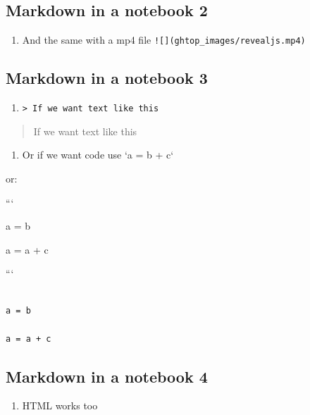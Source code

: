 \documentclass[
  letterpaper,
  DIV=11,
  numbers=noendperiod]{scrartcl}
\providecommand{\tightlist}{%
  \setlength{\itemsep}{0pt}\setlength{\parskip}{0pt}}\usepackage{longtable,booktabs,array}
\begin{document}
\hypertarget{markdown-in-a-notebook-2}{%
\subsection{Markdown in a notebook 2}\label{markdown-in-a-notebook-2}}

\begin{enumerate}
\def\labelenumi{\arabic{enumi}.}
\setcounter{enumi}{2}
\tightlist
\item
  And the same with a mp4 file
  \texttt{!{[}{]}(ghtop\_images/revealjs.mp4)}
\end{enumerate}

\hypertarget{markdown-in-a-notebook-3}{%
\subsection{Markdown in a notebook 3}\label{markdown-in-a-notebook-3}}

\begin{enumerate}
\def\labelenumi{\arabic{enumi}.}
\setcounter{enumi}{3}
\tightlist
\item
  \texttt{\textgreater{}\ If\ we\ want\ text\ like\ this}
\end{enumerate}

\begin{quote}
If we want text like this
\end{quote}

\begin{enumerate}
\def\labelenumi{\arabic{enumi}.}
\setcounter{enumi}{4}
\tightlist
\item
  Or if we want code use `a = b + c`
\end{enumerate}

or:

```

a = b

a = a + c

```

\begin{verbatim}

a = b

a = a + c
\end{verbatim}

\hypertarget{markdown-in-a-notebook-4}{%
\subsection{Markdown in a notebook 4}\label{markdown-in-a-notebook-4}}

\begin{enumerate}
\def\labelenumi{\arabic{enumi}.}
\setcounter{enumi}{5}
\tightlist
\item
  HTML works too
\end{enumerate}
\end{document}
